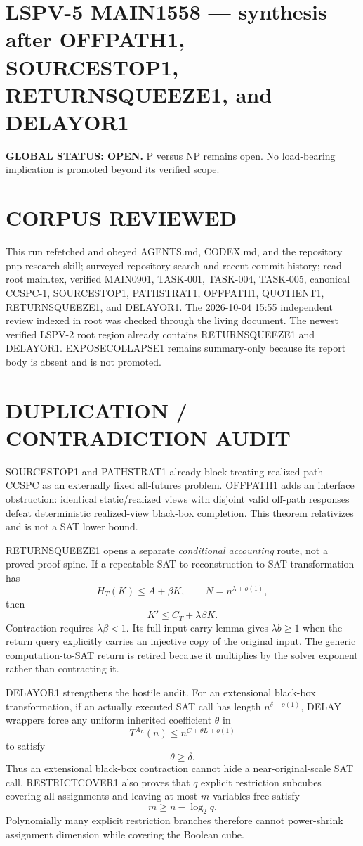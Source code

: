 \documentclass[11pt]{article}
\begin{document}
\section*{LSPV-5 MAIN1558 --- synthesis after OFFPATH1, SOURCESTOP1, RETURNSQUEEZE1, and DELAYOR1}
\textbf{GLOBAL STATUS: OPEN.} P versus NP remains open. No load-bearing implication is promoted beyond its verified scope.

\section*{CORPUS REVIEWED}
This run refetched and obeyed AGENTS.md, CODEX.md, and the repository pnp-research skill; surveyed repository search and recent commit history; read root main.tex, verified MAIN0901, TASK-001, TASK-004, TASK-005, canonical CCSPC-1, SOURCESTOP1, PATHSTRAT1, OFFPATH1, QUOTIENT1, RETURNSQUEEZE1, and DELAYOR1. The 2026-10-04 15:55 independent review indexed in root was checked through the living document. The newest verified LSPV-2 root region already contains RETURNSQUEEZE1 and DELAYOR1. EXPOSECOLLAPSE1 remains summary-only because its report body is absent and is not promoted.

\section*{DUPLICATION / CONTRADICTION AUDIT}
SOURCESTOP1 and PATHSTRAT1 already block treating realized-path CCSPC as an externally fixed all-futures problem. OFFPATH1 adds an interface obstruction: identical static/realized views with disjoint valid off-path responses defeat deterministic realized-view black-box completion. This theorem relativizes and is not a SAT lower bound.

RETURNSQUEEZE1 opens a separate \emph{conditional accounting} route, not a proved proof spine. If a repeatable SAT-to-reconstruction-to-SAT transformation has
\[
H_T(K)\le A+\beta K,\qquad N=n^{\lambda+o(1)},
\]
then
\[
K'\le C_T+\lambda\beta K.
\]
Contraction requires \(\lambda\beta<1\). Its full-input-carry lemma gives \(\lambda b\ge1\) when the return query explicitly carries an injective copy of the original input. The generic computation-to-SAT return is retired because it multiplies by the solver exponent rather than contracting it.

DELAYOR1 strengthens the hostile audit. For an extensional black-box transformation, if an actually executed SAT call has length \(n^{\delta-o(1)}\), DELAY wrappers force any uniform inherited coefficient \(\theta\) in
\[
T^{A_L}(n)\le n^{C+\theta L+o(1)}
\]
to satisfy
\[
\theta\ge\delta.
\]
Thus an extensional black-box contraction cannot hide a near-original-scale SAT call. RESTRICTCOVER1 also proves that \(q\) explicit restriction subcubes covering all assignments and leaving at most \(m\) variables free satisfy
\[
m\ge n-\log_2 q.
\]
Polynomially many explicit restriction branches therefore cannot power-shrink assignment dimension while covering the Boolean cube.
\end{document}
